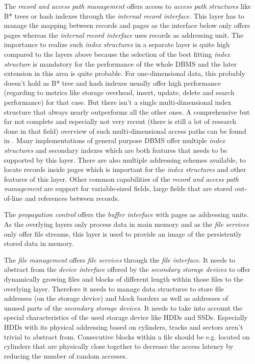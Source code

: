 	The \emph{record and access path management} offers access to \emph{access path structures} like B* trees or hash indexes through the \emph{internal record interface}. This layer has to manage the mapping between records and pages as the interface below only offers pages whereas the \emph{internal record interface} uses records as addressing unit. The importance to realize such \emph{index structures} in a separate layer is quite high compared to the layers above because the selection of the best fitting \emph{index structure} is mandatory for the performance of the whole DBMS and the later extension in this area is quite probable. For one-dimensional data, this probably doesn't hold as B* tree and hash indexes usually offer high performance (regarding to metrics like storage overhead, insert, update, delete and search performance) for that case. But there isn't a single multi-dimensional index structure that always nearly outperforms all the other ones. A comprehensive but far not complete and especially not very recent (there is still a lot of research done in that field) overview of such multi-dimensional access paths can be found in \cite{Gaede:1998}. Many implementations of general purpose DBMS offer multiple \emph{index structures} and secondary indexes which are both features that needs to be supported by this layer. There are also multiple addressing schemes available, to locate records inside pages which is important for the \emph{index structures} and other features of this layer. Other common capabilities of the \emph{record and access path management} are support for variable-sized fields, large fields that are stored out-of-line and references between records.
	
	The \emph{propagation control} offers the \emph{buffer interface} with pages as addressing units. As the overlying layers only process data in main memory and as the \emph{file services} only offer file streams, this layer is used to provide an image of the persistently stored data in memory. 
	
	The \emph{file management} offers \emph{file services} through the \emph{file interface}. It needs to abstract from the \emph{device interface} offered by the \emph{secondary storage devices} to offer dynamically growing files and blocks of different length within those files to the overlying layer. Therefore it needs to manage data structures to store file addresses (on the storage device) and block borders as well as addresses of unused parts of the \emph{secondary storage devices}. It needs to take into account the special characteristics of the used storage device like HDDs and SSDs. Especially HDDs with its physical addressing based on cylinders, tracks and sectors aren't trivial to abstract from. Consecutive blocks within a file should be e.g. located on cylinders that are physically close together to decrease the access latency by reducing the number of random accesses.
	
